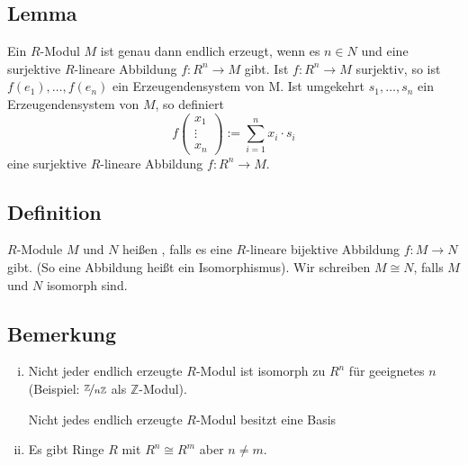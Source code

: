\subsection{Lemma} %
\label{sub:1412}
Ein $R$-Modul $M$ ist genau dann endlich erzeugt, wenn es $n \in N$ und eine surjektive $R$-lineare Abbildung $f : R^n \to M$ gibt.
Ist $f : R^n \to M$ surjektiv, so ist $f(e_1), \ldots , f(e_n)$ ein Erzeugendensystem von M. Ist umgekehrt $s_1, \ldots , s_n$ ein Erzeugendensystem von $M$, so definiert
\[
	f \begin{pmatrix}
		x_1 \\ \vdots \\x_n
	\end{pmatrix} := \sum_{i=1}^{n} x_i \cdot s_i
\]
eine surjektive $R$-lineare Abbildung $f : R^n \to M$. \bewende

\subsection[Definition: Isomorph]{Definition} %
\label{sub:1413}
$R$-Module $M$ und $N$ heißen , falls es eine $R$-lineare bijektive Abbildung $f : M \to N$ gibt. (So eine Abbildung heißt ein Isomorphismus). Wir
schreiben $M \cong N$, falls $M$ und $N$ isomorph sind.

\subsection{Bemerkung} %
\label{sub:1414}
\begin{enumerate}[(i)]
	\item Nicht jeder endlich erzeugte $R$-Modul ist isomorph zu $R^n$ für geeignetes $n$ (Beispiel: $\nicefrac{\mathds{Z}}{n \mathds{Z}}$ als $\mathds{Z}$-Modul).
	
	Nicht jedes endlich erzeugte $R$-Modul besitzt eine Basis
	\item Es gibt Ringe $R$ mit $R^n \cong R^m$ aber $n\not= m$.
\end{enumerate}

